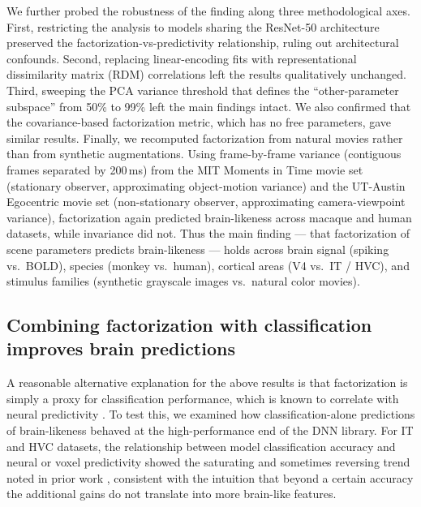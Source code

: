 \documentclass[11pt]{article}
\begin{document}
We further probed the robustness of the finding along three methodological
axes. First, restricting the analysis to models sharing the ResNet-50
architecture preserved the factorization-vs-predictivity relationship,
ruling out architectural confounds. Second, replacing linear-encoding fits
with representational dissimilarity matrix (RDM) correlations
\citep{kriegeskorte2008representational, seeliger2017convolutional} left the
results qualitatively unchanged. Third, sweeping the PCA variance threshold
that defines the ``other-parameter subspace'' from 50\% to 99\% left the
main findings intact. We also confirmed that the covariance-based
factorization metric, which has no free parameters, gave similar results.
Finally, we recomputed factorization from natural movies rather than from
synthetic augmentations. Using frame-by-frame variance (contiguous frames
separated by 200\,ms) from the MIT Moments in Time movie set (stationary
observer, approximating object-motion variance) and the UT-Austin Egocentric
movie set (non-stationary observer, approximating camera-viewpoint
variance), factorization again predicted brain-likeness across macaque and
human datasets, while invariance did not. Thus the main finding --- that
factorization of scene parameters predicts brain-likeness --- holds across
brain signal (spiking vs.\ BOLD), species (monkey vs.\ human), cortical
areas (V4 vs.\ IT / HVC), and stimulus families (synthetic grayscale images
vs.\ natural color movies).

\subsection{Combining factorization with classification improves brain predictions}

A reasonable alternative explanation for the above results is that
factorization is simply a proxy for classification performance, which is
known to correlate with neural predictivity
\citep{yamins2014performance, majaj2015simple}. To test this, we examined
how classification-alone predictions of brain-likeness behaved at the
high-performance end of the DNN library. For IT and HVC datasets, the
relationship between model classification accuracy and neural or voxel
predictivity showed the saturating and sometimes reversing trend noted in
prior work \citep{schrimpf2020integrative}, consistent with the intuition
that beyond a certain accuracy the additional gains do not translate into
more brain-like features.
\end{document}
